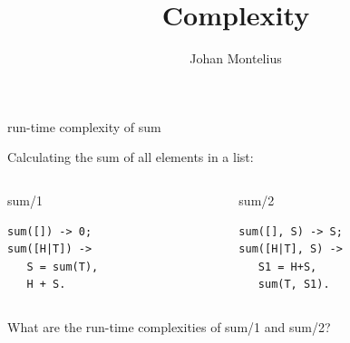 

\title[ID1019 Complexity]{Complexity}


\author{Johan Montelius}
\date{\semester}



\begin{frame}
\titlepage
\end{frame}

\begin{frame}[fragile]{run-time complexity of sum}

Calculating the sum of all elements in a list:

\pause\vspace{20pt}

\begin{columns}
   \begin{column}{.5\linewidth}
     \begin{block}{sum/1}
       \begin{verbatim}
sum([]) -> 0;
sum([H|T]) -> 
   S = sum(T), 
   H + S.
       \end{verbatim}
      \end{block}
    \end{column}
\pause
    \begin{column}{.5\linewidth}
     \begin{block}{sum/2}
       \begin{verbatim}
sum([], S) -> S;
sum([H|T], S) -> 
   S1 = H+S, 
   sum(T, S1).
       \end{verbatim}
      \end{block}
    \end{column}
  \end{columns}

\pause\vspace{20pt}
What are the run-time complexities of sum/1 and sum/2?

\end{frame}


